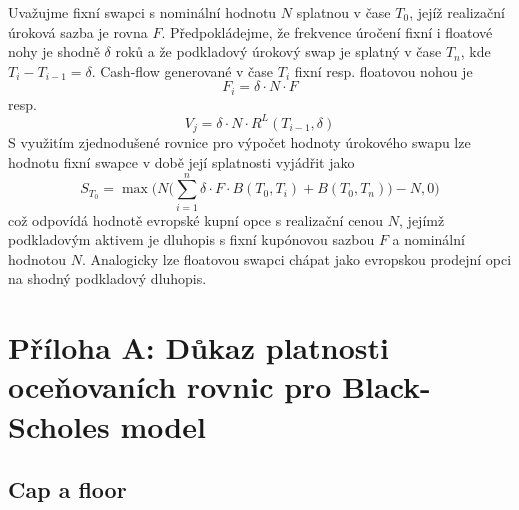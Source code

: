 \documentclass[a4paper]{book}
\begin{document}
Uvažujme fixní swapci s nominální hodnotu $N$ splatnou v čase $T_0$, jejíž realizační úroková sazba je rovna $F$. Předpokládejme, že frekvence úročení fixní i floatové nohy je shodně $\delta$ roků a že podkladový úrokový swap je splatný v čase $T_n$, kde $T_i - T_{i-1} = \delta$. Cash-flow generované v čase $T_i$ fixní resp. floatovou nohou je
\begin{equation*}
F_i = \delta \cdot N \cdot F
\end{equation*}
resp.
\begin{equation*}
V_j = \delta \cdot N \cdot R^L(T_{i-1}, \delta)
\end{equation*}
S využitím zjednodušené rovnice pro výpočet hodnoty úrokového swapu lze hodnotu fixní swapce v době její splatnosti vyjádřit jako
\begin{equation*}
S_{T_0} = \max \Bigg( N \Big( \sum_{i = 1}^n \delta \cdot F \cdot B(T_0, T_i) + B(T_0, T_n) \Big) - N, 0 \Bigg)
\end{equation*}
což odpovídá hodnotě evropské kupní opce s realizační cenou $N$, jejímž podkladovým aktivem je dluhopis s fixní kupónovou sazbou $F$ a nominální hodnotou $N$. Analogicky lze floatovou swapci chápat jako evropskou prodejní opci na shodný podkladový dluhopis.

\section{Příloha A: Důkaz platnosti oceňovaních rovnic pro Black-Scholes model}

\subsection{Cap a floor}
\end{document}
